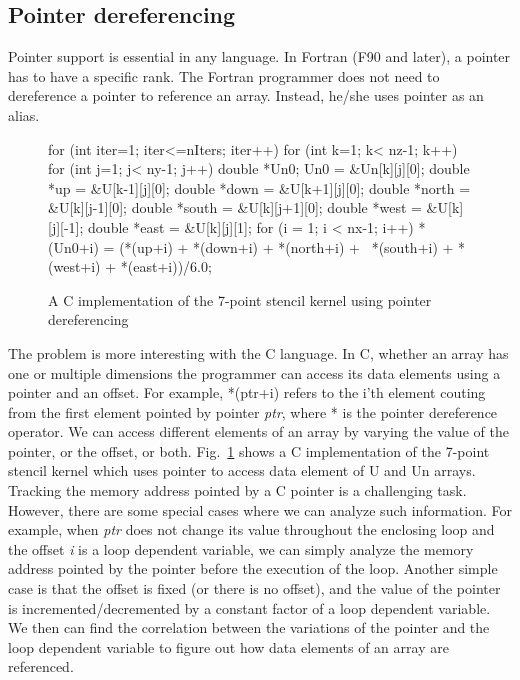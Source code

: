 \documentclass{article}
\begin{document}
\subsection{Pointer dereferencing}
Pointer support is essential in any language. 
In Fortran (F90 and later), a pointer has to have a specific rank.
The Fortran programmer does not need to dereference a pointer to reference an array.
Instead, he/she uses pointer as an alias.



\begin{figure}[htp]
\begin{boxedverbatim}
 for (int iter=1; iter<=nIters; iter++){
   for (int k=1; k< nz-1; k++) {
     for (int j=1; j< ny-1; j++) {
       double *Un0;
       Un0 = &Un[k][j][0];
       double *up  = &U[k-1][j][0];
       double *down = &U[k+1][j][0];
       double *north = &U[k][j-1][0];
       double *south = &U[k][j+1][0];
       double *west = &U[k][j][-1];
       double *east = &U[k][j][1];
       for (i = 1; i < nx-1; i++){
         *(Un0+i) = (*(up+i) + *(down+i) + *(north+i) + \ 
         *(south+i) + *(west+i) + *(east+i))/6.0;
       }
     }
   }
 }
\end{boxedverbatim}
\caption{A C implementation of the 7-point stencil kernel using pointer dereferencing}
\label{7pointstencilPtr}
\end{figure}


The problem is more interesting with the C language.
In C, whether an array has one or multiple dimensions the programmer can access its data elements using a pointer and an offset. 
For example, *(ptr+i) refers to the i'th element couting from the first element pointed by pointer {\em ptr}, where * is the pointer dereference operator. 
We can access different elements of an array by varying the value of the pointer, or the offset, or both.
Fig.~\ref{7pointstencilPtr} shows a C implementation of the 7-point stencil kernel which uses pointer to access data element of U and Un arrays.
Tracking the memory address pointed by a C pointer is a challenging task.
However, there are some special cases where we can analyze such information.
For example, when {\em ptr} does not change its value throughout the enclosing loop and the offset {\em i} is a loop dependent variable, we can simply analyze the memory address pointed by the pointer before the execution of the loop.
Another simple case is that the offset is fixed (or there is no offset), and the value of the pointer is incremented/decremented by a constant factor of a loop dependent variable. We then can find the correlation between the variations of the pointer and the loop dependent variable to figure out how data elements of an array are referenced. 
\end{document}
